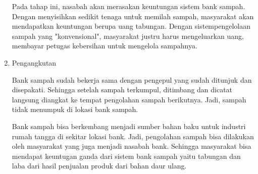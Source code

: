 \begin{enumerate}
Pada tahap ini, nasabah akan merasakan keuntungan sistem bank sampah. Dengan menyisihkan sedikit tenaga untuk memilah sampah, masyarakat akan mendapatkan keuntungan berupa uang tabungan. Dengan sistempengelolaan sampah yang "konvensional", masyarakat justru harus mengeluarkan uang, membayar petugas kebersihan untuk mengelola sampahnya.

\item Pengangkutan

Bank sampah sudah bekerja sama dengan pengepul yang sudah ditunjuk dan disepakati. Sehingga setelah sampah terkumpul, ditimbang dan dicatat langsung diangkat ke tempat pengolahan sampah berikutnya. Jadi, sampah tidak menumpuk di lokasi bank sampah.

Bank sampah bisa berkembang menjadi sumber bahan baku untuk industri rumah tangga di sekitar lokasi bank. Jadi, pengolahan sampah bisa dilakukan oleh masyarakat yang juga menjadi nasabah bank. Sehingga masyarakat bisa mendapat keuntugan ganda dari sistem bank sampah yaitu tabungan dan laba dari hasil penjualan produk dari bahan daur ulang.
\end{enumerate}

